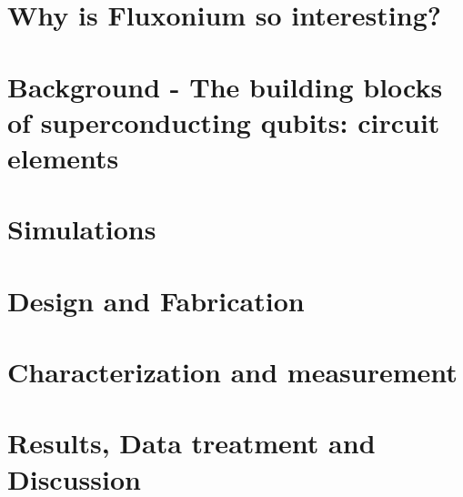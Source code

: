 \documentclass[paper = a4, 12pt, oneside]{scrbook}
\begin{document}
    
        
        
        \setcounter{tocdepth}{2} %
        \setcounter{secnumdepth}{2} %
        \tableofcontents 
        \listoffigures
        \listoftables
        \printglossary[type=\acronymtype]
        \part{Why is Fluxonium so interesting?}\label{part:I}
            
            
        \part{Background - The building blocks of superconducting qubits: circuit elements}\label{part:II}
            
            
            
            
            
            
        \part{Simulations}\label{part:III}
            
        \part{Design and Fabrication}\label{part:IV} %
            
            
        \part{Characterization and measurement}\label{part:V}
            
            
        \part{Results, Data treatment and Discussion}\label{part:VI}
            
            
\end{document}
